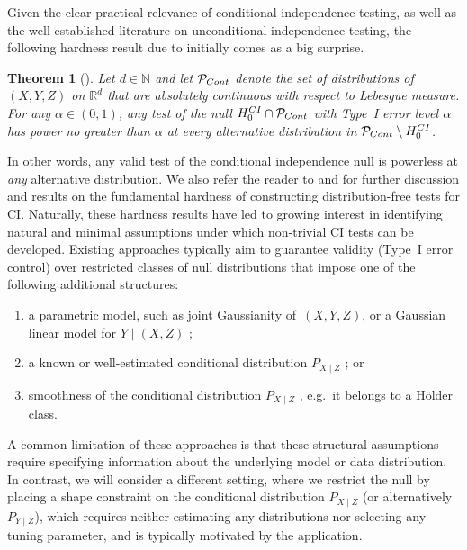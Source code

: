 \documentclass[12pt]{article}
\newtheorem{theorem}{Theorem}%
\newcommand{\R}{\mathbb{R}}
\begin{document}
Given the clear practical relevance of conditional independence testing, as well as the well-established literature on unconditional independence testing, the following hardness result due to \citet{shah2020hardness} initially comes as a big surprise.
\begin{theorem}[\citealp{shah2020hardness}]\label{thm:hardness_CI}
    Let $d \in \mathbb{N}$ and let $\mathcal{P}_{\textnormal{Cont}}$ denote the set of distributions of $(X,Y,Z)$ on $\R^{d}$ that are absolutely continuous with respect to Lebesgue measure.  For any $\alpha\in (0,1)$, any test of the null $H_0^{\textnormal{CI}} \cap \mathcal{P}_{\textnormal{Cont}}$ with Type~I error level $\alpha$ has power no greater than $\alpha$ at every alternative distribution in $\mathcal{P}_{\textnormal{Cont}}\setminus H_0^{\textnormal{CI}}$.
\end{theorem}
In other words, any valid test of the conditional independence null is powerless at \emph{any} alternative distribution.
We also refer the reader to \citet{neykov2021minimax} and \citet{kim2022local} for further discussion and results on the fundamental hardness of constructing distribution-free tests for CI. Naturally, these hardness results have led to growing interest in identifying natural and minimal assumptions under which non-trivial CI tests can be developed. Existing approaches typically aim to guarantee validity (Type~I error control) over restricted classes of null distributions that impose one of the following additional structures:
\begin{enumerate}
    \item[(a)] a parametric model, such as joint Gaussianity of~$(X, Y, Z)$, or a Gaussian linear model for $Y\mid (X,Z)$ \citep[e.g.,][]{kalisch2007estimating,Epskamp04072018,colombo12};
    \item[(b)] a known or well-estimated conditional distribution $P_{X\mid Z}$ \citep{candes2018panning,barber2020robust,berrett2020conditional,niu2024reconciling}; or 
    \item[(c)] smoothness of the conditional distribution $P_{X\mid Z}$ \citep{shah2020hardness,lundborg2022conditional,kim2022local,lundborg2022projected}, e.g.~it belongs to a H\"older class.
\end{enumerate}

A common limitation of these approaches is that these structural assumptions require specifying information about the underlying model or data distribution. In contrast, we will consider a different setting, where we restrict the null by placing a shape constraint on the conditional distribution $P_{X\mid Z}$ (or alternatively $P_{Y\mid Z}$), which requires neither estimating any distributions nor selecting any tuning parameter, and is typically motivated by the application.
\end{document}

